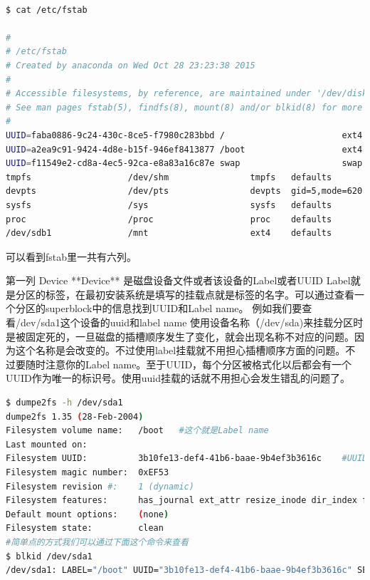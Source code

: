 \begin{lstlisting}[language=bash]

$ cat /etc/fstab

#
# /etc/fstab
# Created by anaconda on Wed Oct 28 23:23:38 2015
#
# Accessible filesystems, by reference, are maintained under '/dev/disk'
# See man pages fstab(5), findfs(8), mount(8) and/or blkid(8) for more info
#
UUID=faba0886-9c24-430c-8ce5-f7980c283bbd /                       ext4    defaults        1 1
UUID=a2ea9c91-9424-4d8e-b15f-946ef8413877 /boot                   ext4    defaults        1 2
UUID=f11549e2-cd8a-4ec5-92ca-e8a83a16c87e swap                    swap    defaults        0 0
tmpfs                   /dev/shm                tmpfs   defaults        0 0
devpts                  /dev/pts                devpts  gid=5,mode=620  0 0
sysfs                   /sys                    sysfs   defaults        0 0
proc                    /proc                   proc    defaults        0 0
/dev/sdb1               /mnt                    ext4    defaults        0 0

\end{lstlisting}

可以看到fstab里一共有六列。

第一列 Device **Device**  是磁盘设备文件或者该设备的Label或者UUID
Label就是分区的标签，在最初安装系统是填写的挂载点就是标签的名字。可以通过查看一个分区的superblock中的信息找到UUID和Label name。
例如我们要查看/dev/sda1这个设备的uuid和label name
使用设备名称（/dev/sda)来挂载分区时是被固定死的，一旦磁盘的插槽顺序发生了变化，就会出现名称不对应的问题。因为这个名称是会改变的。不过使用label挂载就不用担心插槽顺序方面的问题。不过要随时注意你的Label name。至于UUID，每个分区被格式化以后都会有一个UUID作为唯一的标识号。使用uuid挂载的话就不用担心会发生错乱的问题了。

\begin{lstlisting}[language=bash]
$ dumpe2fs -h /dev/sda1
dumpe2fs 1.35 (28-Feb-2004)
Filesystem volume name:   /boot   #这个就是Label name
Last mounted on:
Filesystem UUID:          3b10fe13-def4-41b6-baae-9b4ef3b3616c    #UUID
Filesystem magic number:  0xEF53
Filesystem revision #:    1 (dynamic)
Filesystem features:      has_journal ext_attr resize_inode dir_index filetype needs_recovery sparse_super
Default mount options:    (none)
Filesystem state:         clean
#简单点的方式我们可以通过下面这个命令来查看
$ blkid /dev/sda1
/dev/sda1: LABEL="/boot" UUID="3b10fe13-def4-41b6-baae-9b4ef3b3616c" SEC_TYPE="ext3" TYPE="ext2"
\end{lstlisting}


